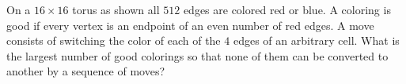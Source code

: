 On a  $16 \times 16$ torus as shown all $512$ edges are colored red or blue. A coloring is good if every vertex is an endpoint of an even number of red edges. A move consists of switching the color of each of the $4$ edges of an arbitrary cell. What is the largest number of good colorings so that none of them can be converted to another by a sequence of moves?